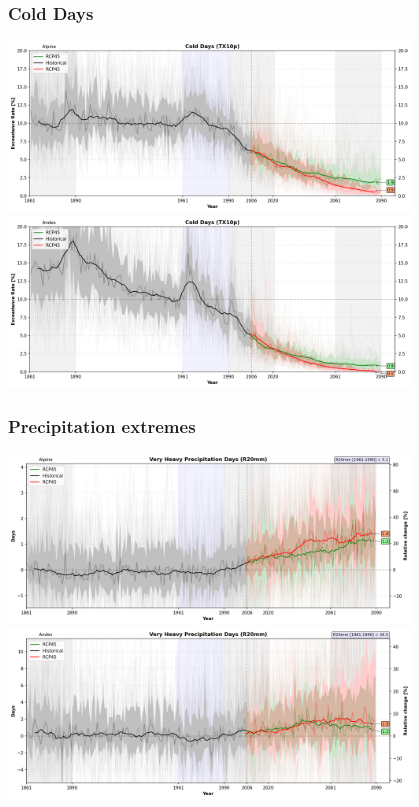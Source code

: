 \documentclass[14pt,usenames,dvipsnames]{beamer}
\begin{document}

\begin{frame}
\frametitle{Cold Days}
\begin{center}

{\includegraphics[width=0.8\textwidth]{risultati/tx10p_Alpine_Models_ts_lim_20}}
{\includegraphics[width=0.8\textwidth]{risultati/tx10p_Andes_Models_ts_lim_20}}
\end{center}
\end{frame}


\begin{frame}
\frametitle{Precipitation extremes}
\begin{center}

{\includegraphics[width=0.8\textwidth]{risultati/r20mm_Alpine_Models_ts}}
{\includegraphics[width=0.8\textwidth]{risultati/r20mm_Andes_Models_ts}}
\end{center}
\end{frame}
\end{document}
